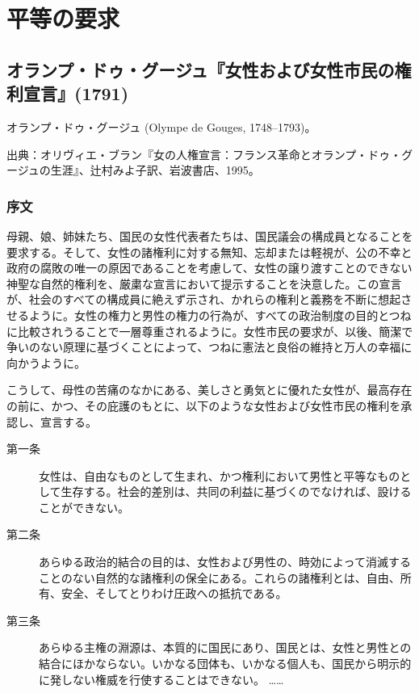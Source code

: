 \chapter{平等の要求}








\section{オランプ・ドゥ・グージュ『女性および女性市民の権利宣言』(1791)}

オランプ・ドゥ・グージュ (Olympe de Gouges, 1748--1793)。


出典：オリヴィエ・ブラン『女の人権宣言：フランス革命とオランプ・ドゥ・グージュの生涯』、辻村みよ子訳、岩波書店、1995。

\subsection*{序文}

母親、娘、姉妹たち、国民の女性代表者たちは、国民議会の構成員となることを要求する。そして、女性の諸権利に対する無知、忘却または軽視が、公の不幸と政府の腐敗の唯一の原因であることを考慮して、女性の譲り渡すことのできない神聖な自然的権利を、厳粛な宣言において提示することを決意した。この宣言が、社会のすべての構成員に絶えず示され、かれらの権利と義務を不断に想起させるように。女性の権力と男性の権力の行為が、すべての政治制度の目的とつねに比較されうることで一層尊重されるように。女性市民の要求が、以後、簡潔で争いのない原理に基づくことによって、つねに憲法と良俗の維持と万人の幸福に向かうように。

こうして、母性の苦痛のなかにある、美しさと勇気とに優れた女性が、最高存在の前に、かつ、その庇護のもとに、以下のような女性および女性市民の権利を承認し、宣言する。

\begin{description}

 \item[第一条] 女性は、自由なものとして生まれ、かつ権利において男性と平等なものとして生存する。社会的差別は、共同の利益に基づくのでなければ、設けることができない。

 \item[第二条] あらゆる政治的結合の目的は、女性および男性の、時効によって消滅することのない自然的な諸権利の保全にある。これらの諸権利とは、自由、所有、安全、そしてとりわけ圧政への抵抗である。

 \item[第三条] あらゆる主権の淵源は、本質的に国民にあり、国民とは、女性と男性との結合にほかならない。いかなる団体も、いかなる個人も、国民から明示的に発しない権威を行使することはできない。
……

 \end{description}




